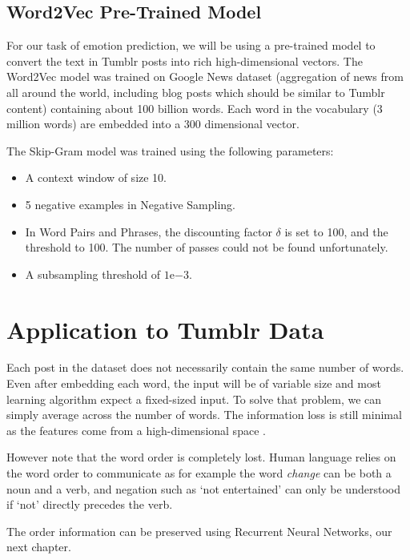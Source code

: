 \subsection{Word2Vec Pre-Trained Model}

For our task of emotion prediction, we will be using a pre-trained model to convert the text in Tumblr posts into rich high-dimensional vectors. The Word2Vec model was trained on Google News dataset (aggregation of news from all around the world, including blog posts which should be similar to Tumblr content) containing about 100 billion words. Each word in the vocabulary (3 million words) are embedded into a 300 dimensional vector. 

The Skip-Gram model was trained using the following parameters:
\begin{itemize}
    \item A context window of size 10.
    \item 5 negative examples in Negative Sampling.
    \item In Word Pairs and Phrases, the discounting factor $\delta$ is set to 100, and the threshold to 100. The number of passes could not be found unfortunately.
    \item A subsampling threshold of $1\mathrm{e}{-3}.$
\end{itemize}

\section{Application to Tumblr Data}
Each post in the dataset does not necessarily contain the same number of words. Even after embedding each word, the input will be of variable size and most learning algorithm expect a fixed-sized input. To solve that problem, we can simply average across the number of words. The information loss is still minimal as the features come from a high-dimensional space \cite{seth1}.

However note that the word order is completely lost. Human language relies on the word order to communicate as for example the word {\em change} can be both a noun and a verb, and negation such as `not entertained' can only be understood if `not' directly precedes the verb.

The order information can be preserved using Recurrent Neural Networks, our next chapter.







